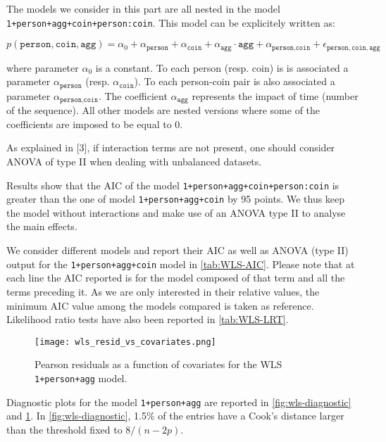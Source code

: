 \documentclass[a4paper, 12pt,oneside]{article}
\begin{document}
			The models we consider in this part are all nested in the model \texttt{1+person+agg+coin+person:coin}.
			This model can be explicitely written as: 

			\begin{equation}
				\label{eq:wls_model}
				p(\texttt{person},\texttt{coin},\texttt{agg}) = \alpha_0 + \alpha_{\texttt{person}}+\alpha_{\texttt{coin}} +\alpha_{\texttt{agg}}\cdot\texttt{agg} +\alpha_{\texttt{person},\texttt{coin}} + \epsilon_{\texttt{person},\texttt{coin},\texttt{agg}}
			\end{equation}

			where parameter $\alpha_0$ is a constant. To each person (resp. coin) is is associated a parameter
			$\alpha_{\texttt{person}}$ (resp. $\alpha_{\texttt{coin}}$). To each person-coin pair is also associated a parameter $\alpha_{\texttt{person},\texttt{coin}}$. The coefficient $\alpha_{\texttt{agg}}$ represents the impact of time (number of the sequence). All other models are nested versions where some of the coefficients are imposed to be equal to 0.


			
			As explained in [3], if interaction terms are not present, one should consider ANOVA of type II when dealing with unbalanced datasets.

			Results show that the AIC of the model \texttt{1+person+agg+coin+person:coin} is greater than the one of model \texttt{1+person+agg+coin} by 95 points. We thus keep the model without interactions and make use of an ANOVA type II to analyse the main effects. 

			We consider different models and report their AIC as well as  ANOVA (type II) output for the \texttt{1+person+agg+coin} model in \ref{tab:WLS-AIC}. Please note that at each line the AIC reported is for the model composed of that term and all the terms preceding it. As we are only interested in their relative values, the minimum AIC value among the models compared is taken as reference. 
			Likelihood ratio tests have also been reported in \ref{tab:WLS-LRT}.
			\begin{figure}[htb]
				\vspace{-1em}
				\centering
				\texttt{[image: wls\_resid\_vs\_covariates.png]}
				\caption{Pearson residuals as a function of covariates for the WLS \texttt{1+person+agg} model.}
				\label{fig:wls-diagnostic-time-coefs}
			\end{figure}

			Diagnostic plots for the model \texttt{1+person+agg} are reported in \ref{fig:wls-diagnostic} and \ref{fig:wls-diagnostic-time-coefs}. In \ref{fig:wls-diagnostic}, 1.5\% of the entries have a Cook's distance larger than the threshold fixed to $8/(n-2p)$. 
\end{document}
